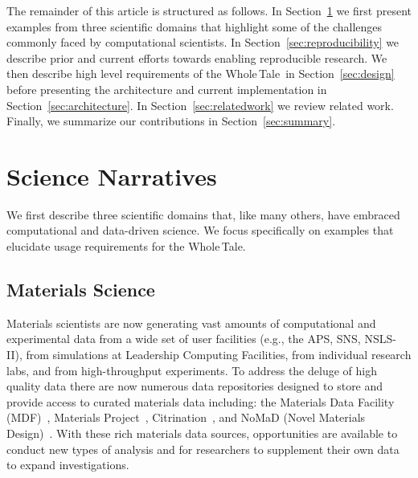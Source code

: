 \documentclass{elsarticle}
\newcommand{\wt}{Whole\,Tale}
\begin{document}
The remainder of this article is structured as follows. In Section~\ref{sec:science} we first
present examples from three scientific domains that highlight some of the challenges commonly faced by computational scientists. In Section~\ref{sec:reproducibility} we describe prior and current efforts towards enabling reproducible research. We then describe high level requirements of the \wt\ in Section~\ref{sec:design} before presenting
the architecture and current implementation in Section~\ref{sec:architecture}.
In Section~\ref{sec:relatedwork} we review related work. Finally, we summarize our contributions
in Section~\ref{sec:summary}.


\section{Science Narratives}\label{sec:science}


We first describe three scientific domains that, like many others, have
embraced computational and data-driven science. We 
focus specifically on examples that elucidate usage requirements for the \wt. 

\subsection{Materials Science}
Materials scientists are now generating vast amounts of computational and 
experimental data from a wide set of user facilities (e.g., the APS, SNS, NSLS-II), 
from simulations at Leadership Computing Facilities, from individual 
research labs, and from high-throughput experiments. To address the deluge
of high quality data there are now numerous data repositories designed to 
store and provide access to curated materials data including: the Materials Data Facility (MDF)~\cite{blaiszik16mdf}, 
Materials Project~\cite{jain13materialsproject}, Citrination~\cite{omara16citrination}, and NoMaD (Novel Materials Design)~\cite{thygesen16nomad}. With these rich materials 
data sources, opportunities are available to
conduct new types of analysis and for researchers to supplement their own data to expand investigations.
 
\end{document}
